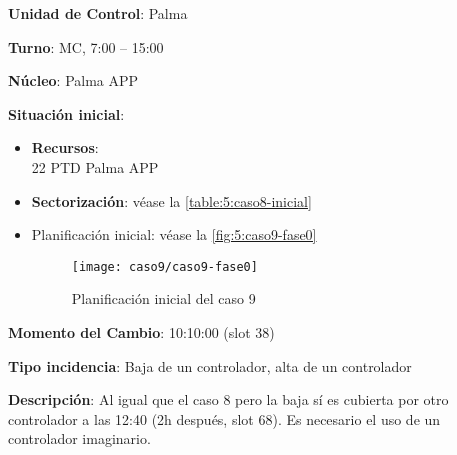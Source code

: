 \textbf{Unidad de Control}: Palma

\textbf{Turno}: MC, 7:00 -- 15:00

\textbf{Núcleo}: Palma APP

\textbf{Situación inicial}:
\begin{itemize}[label={}]
	
	\item \textbf{Recursos}: \\
	22 PTD Palma APP \\
	
	\item \textbf{Sectorización}: véase la \autoref{table:5:caso8-inicial}
	
	\item Planificación inicial: véase la \autoref{fig:5:caso9-fase0}
	
	\begin{figure}[!h]
		\centering
		\texttt{[image: caso9/caso9-fase0]}
		\caption{Planificación inicial del caso 9}
		\label{fig:5:caso9-fase0}
	\end{figure}
	
\end{itemize}

\textbf{Momento del Cambio}: 10:10:00 (slot 38)

\textbf{Tipo incidencia}: Baja de un controlador, alta de un controlador

\textbf{Descripción}: Al igual que el caso 8 pero la baja sí es cubierta por otro controlador a las 12:40 (2h después, slot 68). Es necesario el uso de un controlador imaginario.
